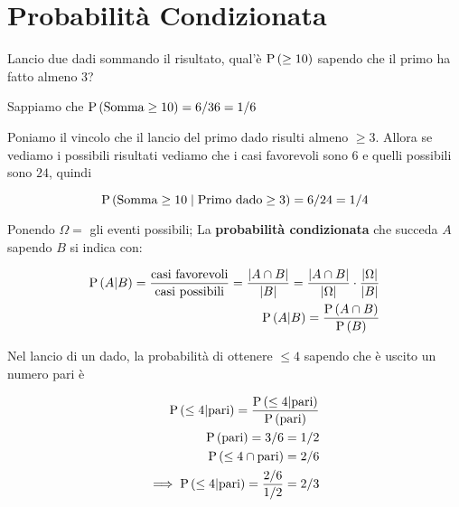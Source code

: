 \section{Probabilit\`a Condizionata}

\begin{exmp}
    Lancio due dadi sommando il risultato, qual'\`e $ \text{P}\left(\geq 10\right) $ sapendo che il primo ha fatto almeno 3?

    Sappiamo che $ \text{P}\left(\text{Somma} \geq 10\right) = 6/36 = 1/6 $
    
	Poniamo il vincolo che il lancio del primo dado risulti almeno $ \geq 3 $. Allora se vediamo i possibili
    risultati vediamo che i casi favorevoli sono $6$ e quelli possibili sono $24$, quindi

    \begin{equation*}
    \text{P}\left(\text{Somma} \geq 10 \mid \text{Primo dado} \geq 3\right) = 6/24 = 1/4
    \end{equation*}
\end{exmp}



\begin{defn}
    
    Ponendo $ \Omega = $ gli eventi possibili;
    La \textbf{probabilit\`a condizionata} che succeda $ A $ sapendo $ B $ si indica con:
    
    \begin{equation}
    \begin{aligned}
    \text{P}\left(A|B\right) = \dfrac{\text{casi favorevoli}}{\text{casi possibili}} = \dfrac{\lvert A \cap B\rvert}{\lvert B\rvert} = \dfrac{\lvert A \cap B\rvert}{\lvert\Omega\rvert} \cdot \dfrac{\lvert\Omega\rvert}{\lvert B\rvert} \\
    \text{P}\left(A|B\right) = \dfrac{\text{P}\left(A \cap B\right)}{\text{P}\left(B\right)}	
    \end{aligned}
    \end{equation}
    
\end{defn}

\begin{exmp}
    Nel lancio di un dado, la probabilit\`a di ottenere $ \leq 4 $ sapendo che \`e uscito un numero pari \`e
    
    \begin{equation*}
    \begin{aligned}
    \text{P}\left(\leq 4|\text{pari}\right) = \dfrac{\text{P}\left(\leq 4 | \text{pari}\right)}{\text{P}\left(\text{pari}\right)} \\
    \text{P}\left(\text{pari}\right) = 3/6 = 1/2 \\
    \text{P}\left(\leq 4 \cap \text{pari}\right) = 2/6 \\
    \implies \text{P}\left(\leq 4|\text{pari}\right) = \dfrac{2/6}{1/2} = 2/3
    \end{aligned}
    \end{equation*}
\end{exmp}


